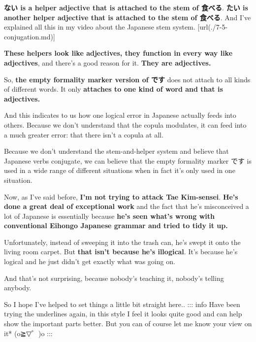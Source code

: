 {\bf ない is a helper adjective that is attached to the stem of 食べる}. {\bf たい is another helper adjective that is attached to the stem of 食べる}. And I've explained all this in my video about the Japanese stem system. \goto{{[}7.5{]}}[url(./7-5-conjugation.md)]

{\bf These helpers look like adjectives, they function in every way like adjectives}, and there's a good reason for it. {\bf They are adjectives.}

So, {\bf the empty formality marker version of です} does not attach to all kinds of different words. It only {\bf attaches to one kind of word and that is adjectives.}

And this indicates to us how one logical error in Japanese actually feeds into others. Because we don't understand that the copula modulates, it can feed into a much greater error: that there isn't a copula at all.

Because we don't understand the stem-and-helper system and believe that Japanese verbs conjugate, we can believe that the empty formality marker です is used in a wide range of different situations when in fact it's only used in one situation.

Now, as I've said before, {\bf I'm not trying to attack Tae Kim-sensei}. {\bf He's done a great deal of exceptional work} and the fact that he's misconceived a lot of Japanese is essentially because {\bf he's seen what's wrong with conventional Eihongo Japanese grammar and tried to tidy it up.}

Unfortunately, instead of sweeping it into the trash can, he's swept it onto the living room carpet. But {\bf that isn't because he's illogical}. It's because he's logical and he just didn't get exactly what was going on.

And that's not surprising, because nobody's teaching it, nobody's telling anybody.

So I hope I've helped to set things a little bit straight here.. ::: info Have been trying the underlines again, in this style I feel it looks quite good and can help show the important parts better. But you can of course let me know your view on it* (o≧▽゜)o :::

\stopsectionlevel

\stopsectionlevel
